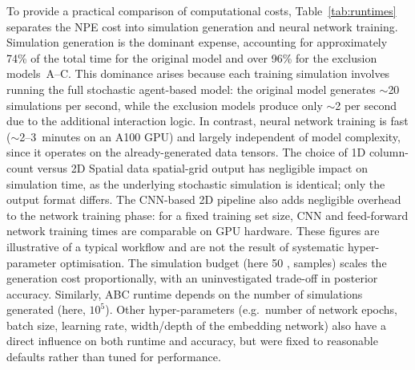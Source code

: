 \documentclass{article}
\providecommand{\DIFaddtex}[1]{{\protect\color{blue} \sf #1}} %
\providecommand{\DIFdeltex}[1]{{\protect\color{red} \scriptsize #1}} %
\providecommand{\DIFaddbegin}{} %
\providecommand{\DIFaddend}{} %
\providecommand{\DIFdelbegin}{} %
\providecommand{\DIFdelend}{} %
\providecommand{\DIFadd}[1]{\texorpdfstring{\DIFaddtex{#1}}{#1}} %
\providecommand{\DIFdel}[1]{\texorpdfstring{\DIFdeltex{#1}}{}} %
\newcommand{\DIFscaledelfig}{0.5}
\newlength{\DIFdelgraphicswidth} %
\newlength{\DIFdelgraphicsheight} %
\newcommand{\DIFaddincludegraphics}[2][]{{\color{blue}\fbox{\DIFOincludegraphics[#1]{#2}}}} %
\newcommand{\DIFdelincludegraphics}[2][]{%
\sbox{\DIFdelgraphicsbox}{\DIFOincludegraphics[#1]{#2}}%
\settoboxwidth{\DIFdelgraphicswidth}{\DIFdelgraphicsbox} %
\settoboxtotalheight{\DIFdelgraphicsheight}{\DIFdelgraphicsbox} %
\scalebox{\DIFscaledelfig}{%
\parbox[b]{\DIFdelgraphicswidth}{\usebox{\DIFdelgraphicsbox}\\[-\baselineskip] \rule{\DIFdelgraphicswidth}{0em}}\llap{\resizebox{\DIFdelgraphicswidth}{\DIFdelgraphicsheight}{%
\setlength{\unitlength}{\DIFdelgraphicswidth}%
\begin{picture}(1,1)%
\thicklines\linethickness{2pt} %
{\color[rgb]{1,0,0}\put(0,0){\framebox(1,1){}}}%
{\color[rgb]{1,0,0}\put(0,0){\line( 1,1){1}}}%
{\color[rgb]{1,0,0}\put(0,1){\line(1,-1){1}}}%
\end{picture}%
}\hspace*{3pt}}} %
} %
\DeclareRobustCommand{\DIFaddbegin}{\DIFOaddbegin \let\includegraphics\DIFaddincludegraphics} %
\DeclareRobustCommand{\DIFaddend}{\DIFOaddend \let\includegraphics\DIFOincludegraphics} %
\DeclareRobustCommand{\DIFdelbegin}{\DIFOdelbegin \let\includegraphics\DIFdelincludegraphics} %
\DeclareRobustCommand{\DIFdelend}{\DIFOaddend \let\includegraphics\DIFOincludegraphics} %
\begin{document}
\DIFadd{To provide a practical comparison of computational costs, Table~\ref{tab:runtimes} separates the NPE cost into simulation generation and neural network training. Simulation generation is the dominant expense, accounting for approximately 74\% of the total time for the original model and over 96\% for the exclusion models~A--C. This dominance arises because each training simulation involves running the full stochastic agent-based model: the original model generates $\sim$20 simulations per second, while the exclusion models produce only $\sim$2 per second due to the additional interaction logic. In contrast, neural network training is fast ($\sim$2--3~minutes on an A100 GPU) and largely independent of model complexity, since it operates on the already-generated data tensors. The choice of 1D column-count versus }\DIFaddend 2D \DIFdelbegin \DIFdel{Spatial data }\DIFdelend \DIFaddbegin \DIFadd{spatial-grid output has negligible impact on simulation time, as the underlying stochastic simulation is identical; only the output format differs. The CNN-based 2D pipeline also adds negligible overhead to the network training phase: for a fixed training set size, CNN and feed-forward network training times are comparable on GPU hardware. These figures are illustrative of a typical workflow and are not the result of systematic hyper-parameter optimisation. The simulation budget (here 50}{\DIFadd{,}}\DIFadd{000 samples) scales the generation cost proportionally, with an uninvestigated trade-off in posterior accuracy. Similarly, ABC runtime depends on the number of simulations generated (here, $10^5$). Other hyper-parameters (e.g.\ number of network epochs, batch size, learning rate, width/depth of the embedding network) also have a direct influence on both runtime and accuracy, but were fixed to reasonable defaults rather than tuned for performance.
}
\end{document}
